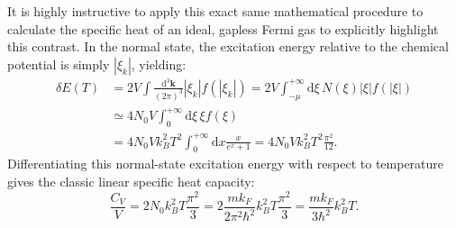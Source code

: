 It is highly instructive to apply this exact same mathematical procedure to calculate the specific heat of an ideal, gapless Fermi gas to explicitly highlight this contrast. In the normal state, the excitation energy relative to the chemical potential is simply \( |\xi_k| \), yielding:
\[
    \begin{aligned}
        \delta E(T) & = 2V \int \frac{\mathrm{d}^3\mathbf{k}}{(2\pi)^3} |\xi_k| f(|\xi_k|) = 2V \int_{-\mu}^{+\infty} \mathrm{d}\xi \, N(\xi) |\xi| f(|\xi|) \\
                    & \simeq 4N_0 V \int_0^{+\infty} \mathrm{d}\xi \, \xi f(\xi)                                                                             \\
                    & = 4N_0 V k_B^2 T^2 \int_0^{+\infty} \mathrm{d}x \frac{x}{e^x + 1} = 4N_0 V k_B^2 T^2 \frac{\pi^2}{12}.
    \end{aligned}
\]
Differentiating this normal-state excitation energy with respect to temperature gives the classic linear specific heat capacity:
\[
    \frac{C_V}{V} = 2N_0 k_B^2 T \frac{\pi^2}{3} = 2 \frac{m k_F}{2\pi^2 \hbar^2} k_B^2 T \frac{\pi^2}{3} = \frac{m k_F}{3\hbar^2} k_B^2 T.
\]

